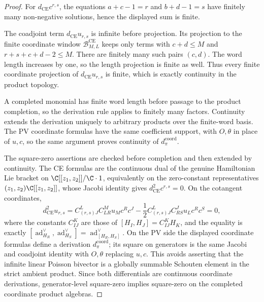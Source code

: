 \begin{proof}
  For \(d_{\mathrm{CE}}c^{r,s}\), the equations
  \(a+c-1=r\) and \(b+d-1=s\) have finitely many non-negative
  solutions, hence the displayed sum is finite.

  The coadjoint term \(d_{\mathrm{CE}}u_{r,s}\) is infinite before
  projection.  Its projection to the finite coordinate window
  \(\mathcal B_{M,L}^{\mathrm{CE}}\) keeps only terms with
  \(c+d\leq M\) and \(r+s+c+d-2\leq M\).  There are finitely many such
  pairs \((c,d)\).  The word length increases by one, so the length
  projection is finite as well.  Thus every finite coordinate
  projection of \(d_{\mathrm{CE}}u_{r,s}\) is finite, which is exactly
  continuity in the product topology.

  A completed monomial has finite word length before passage to the
  product completion, so the derivation rule applies to finitely many
  factors.  Continuity extends the derivation uniquely to arbitrary
  products over the finite-word basis.  The PV coordinate formulas have
  the same coefficient support, with \(O,\theta\) in place of \(u,c\), so
  the same argument proves continuity of \(d_\pi^{\mathrm{coord}}\).

  The square-zero assertions are checked before completion and then
  extended by continuity.  The CE formulas are the continuous dual of the
  genuine Hamiltonian Lie bracket on
  \(\C[[z_1,z_2]]/\C\cdot1\), equivalently on the zero-constant
  representatives \((z_1,z_2)\C[[z_1,z_2]]\), whose Jacobi identity gives
  \(d_{\mathrm{CE}}^2c^{r,s}=0\).  On the cotangent coordinates,
  \[
    d_{\mathrm{CE}}^2u_{r,s}
    =
    C^L_{(r,s)J}C^M_{LR}u_Mc^Rc^J
    -\frac12 C^L_{(r,s)J}C^J_{RS}u_Lc^Rc^S
    =0,
  \]
  where the constants \(C^K_{IJ}\) are those of
  \([H_I,H_J]=C^K_{IJ}H_K\), and the equality is exactly
  \([\operatorname{ad}^{\vee}_{H_R},\operatorname{ad}^{\vee}_{H_S}]
    =\operatorname{ad}^{\vee}_{[H_R,H_S]}\).
  On the PV side the displayed coordinate formulas define a derivation
  \(d_\pi^{\mathrm{coord}}\); its square on generators is the same Jacobi
  and coadjoint identity with \(O,\theta\) replacing \(u,c\).  This avoids
  asserting that the infinite
  linear Poisson bivector is a globally summable Schouten element in the
  strict ambient product.  Since both differentials are continuous
  coordinate derivations, generator-level square-zero implies
  square-zero on the completed coordinate product algebras.
\end{proof}

